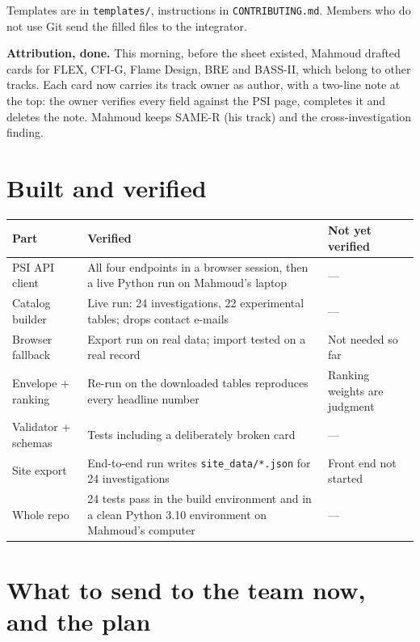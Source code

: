 \documentclass[10pt,a4paper]{article}
\newcommand{\file}[1]{\nolinkurl{#1}}
\begin{document}
Templates are in \file{templates/}, instructions in \file{CONTRIBUTING.md}. Members who do not use Git send the filled files to the integrator.

\textbf{Attribution, done.} This morning, before the sheet existed, Mahmoud drafted cards for FLEX, CFI-G, Flame Design, BRE and BASS-II, which belong to other tracks. Each card now carries its track owner as author, with a two-line note at the top: the owner verifies every field against the PSI page, completes it and deletes the note. Mahmoud keeps SAME-R (his track) and the cross-investigation finding.

\section{Built and verified}\label{sec:built}

\begin{tabularx}{\linewidth}{@{}p{3.6cm}L p{3.6cm}@{}}
\toprule
\textbf{Part} & \textbf{Verified} & \textbf{Not yet verified}\\
\midrule
PSI API client & All four endpoints in a browser session, then a live Python run on Mahmoud's laptop & ---\\
Catalog builder & Live run: 24 investigations, 22 experimental tables; drops contact e-mails & ---\\
Browser fallback & Export run on real data; import tested on a real record & Not needed so far\\
Envelope + ranking & Re-run on the downloaded tables reproduces every headline number & Ranking weights are judgment\\
Validator + schemas & Tests including a deliberately broken card & ---\\
Site export & End-to-end run writes \file{site_data/*.json} for 24 investigations & Front end not started\\
Whole repo & 24 tests pass in the build environment and in a clean Python 3.10 environment on Mahmoud's computer & ---\\
\bottomrule
\end{tabularx}

\section{What to send to the team now, and the plan}
\end{document}
